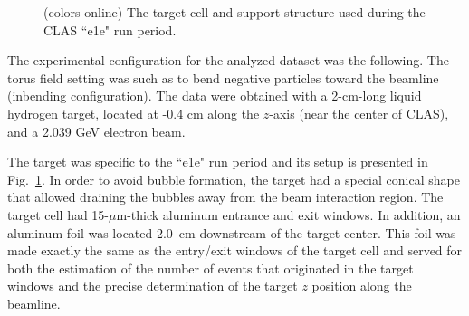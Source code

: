 \documentclass[prc,twocolumn,superscriptaddress,showpacs,amssymb,amsmath,amsfonts,aps,nofootinbib]{revtex4-1}
\begin{document}
\begin{figure}[htp]
\begin{center}
\vspace{-0.1cm}
\caption{(colors online) The target cell and support structure used during the CLAS ``e1e" run period.}
\label{fig:e1e_target}
\end{center}
\end{figure} 

The experimental configuration for the analyzed dataset was the following. The torus field setting was such as to bend negative particles toward the beamline (inbending configuration).
The data  were obtained with a 2-cm-long liquid hydrogen target, located at -0.4 cm along the $z$-axis (near the center of CLAS), and a 2.039 GeV electron beam.


The target was specific to the ``e1e" run period and its setup is presented in Fig.~\ref{fig:e1e_target}. In order to avoid bubble formation, the target had a special conical shape that allowed draining the bubbles away from the beam interaction region. The target cell had 15-$\mu$m-thick aluminum entrance and exit windows. In addition, an aluminum foil was located 2.0~cm downstream of the target center. This foil was made exactly the same as the entry/exit windows of the target cell and served for both  the estimation of the number of events that originated in the target windows and the precise determination of the target $z$ position along the beamline.
\end{document}
